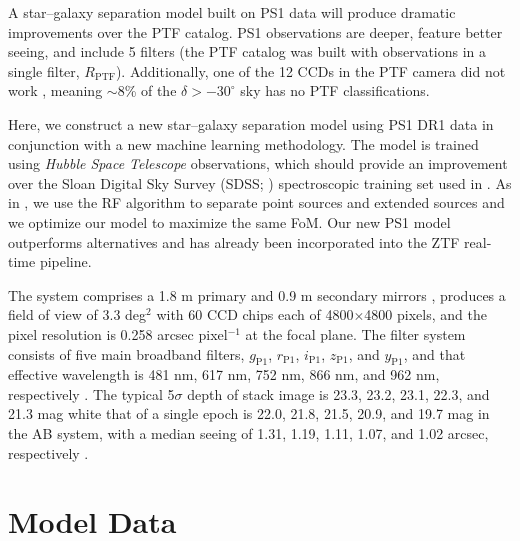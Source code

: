 \documentclass[twocolumn, dvipdfmx]{aastex62}
\begin{document}
A star--galaxy separation model built on PS1 data will produce dramatic
improvements over the PTF catalog. PS1 observations are deeper, feature
better seeing, and include 5 filters (the PTF catalog was built with
observations in a single filter, $R_\mathrm{PTF}$). Additionally, one of the
12 CCDs in the PTF camera did not work \citep{Law09}, meaning $\sim$8\% of
the $\delta > -30^\circ$ sky has no PTF classifications.

Here, we construct a new star--galaxy separation model using PS1 DR1 data in
conjunction with a new machine learning methodology. The model is trained
using \textit{Hubble Space Telescope} observations, which should provide an
improvement over the Sloan Digital Sky Survey (SDSS; \citealt{York00})
spectroscopic training set used in \citet{Miller17}. As in \citet{Miller17},
we use the RF algorithm to separate point sources and extended sources and we optimize our model to maximize the same FoM. Our
new PS1 model outperforms alternatives and has already been incorporated into
the ZTF real-time pipeline.


The system comprises a 1.8 m primary and 0.9 m secondary mirrors \citep{Hodapp04}, 
produces a field of view of 3.3 deg$^2$ with 60 CCD chips each of 4800$\times$4800 pixels, 
and the pixel resolution is 0.258 arcsec pixel$^{-1}$ at the focal plane. 
The filter system consists of five main broadband filters, 
$g_{\mathrm{P1}}$, $r_{\mathrm{P1}}$, $i_{\mathrm{P1}}$, $z_{\mathrm{P1}}$, and $y_{\mathrm{P1}}$, 
and that effective wavelength is 481 nm, 617 nm, 752 nm, 866 nm, and 962 nm, 
respectively \citep{Tonry12, Schlafly12}. 
The typical 5$\sigma$ depth of stack image is 23.3, 23.2, 23.1, 22.3, and 21.3 mag 
white that of a single epoch is 22.0, 21.8, 21.5, 20.9, and 19.7 mag in the AB system, 
with a median seeing of 1.31, 1.19, 1.11, 1.07, and 1.02 arcsec, respectively \citep{Chambers16}. 
\fi


\section{Model Data}\label{sec:model_data}
\end{document}
